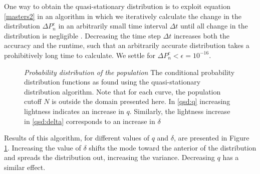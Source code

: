 One way to obtain the quasi-stationary distribution is to exploit equation \ref{masters2} in an algorithm in which we iteratively calculate the change in the distribution $\Delta P^c_n$ in an arbitrarily small time interval $\Delta t$ until all change in the distribution is negligible \cite{Nisbet1982}.
Decreasing the time step $\Delta t$ increases both the accuracy and the runtime, such that an arbitrarily accurate distribution takes a prohibitively long time to calculate.
We settle for $\Delta P^c_n<\epsilon = 10^{-16}$. %

\begin{figure}[ht!]
  \centering
  \hfill
  \caption{\emph{Probability distribution of the population} The conditional probability distribution functions as found using the quasi-stationary distribution algorithm. Note that for each curve, the population cutoff $N$ is outside the domain presented here. In \ref{qsd:q} increasing lightness indicates an increase in $q$. Similarly, the lightness increase in \ref{qsd:delta} corresponds to an increase in $\delta$}
  \label{qsd}
\end{figure}

Results of this algorithm, for different values of $q$ and $\delta$, are presented in Figure \ref{qsd}.
Increasing the value of $\delta$ shifts the mode toward the anterior of the distribution and spreads the distribution out, increasing the variance.
Decreasing $q$ has a similar effect. %
